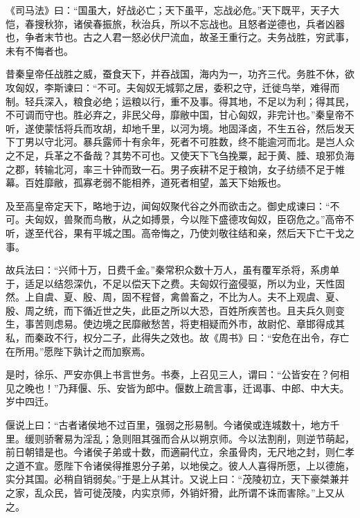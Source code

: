 \documentclass[12pt,UTF8]{ctexbook}
\begin{document}
《司马法》曰：“国虽大，好战必亡；天下虽平，忘战必危。”天下既平，天子大恺，春搜秋狝，诸侯春振旅，秋治兵，所以不忘战也。且怒者逆德也，兵者凶器也，争者末节也。古之人君一怒必伏尸流血，故圣王重行之。夫务战胜，穷武事，未有不悔者也。



昔秦皇帝任战胜之威，蚕食天下，并吞战国，海内为一，功齐三代。务胜不休，欲攻匈奴，李斯谏曰：“不可。夫匈奴无城郭之居，委积之守，迁徙鸟举，难得而制。轻兵深入，粮食必绝；运粮以行，重不及事。得其地，不足以为利；得其民，不可调而守也。胜必弃之，非民父母，靡敝中国，甘心匈奴，非完计也。”秦皇帝不听，遂使蒙恬将兵而攻胡，却地千里，以河为境。地固泽卤，不生五谷，然后发天下丁男以守北河。暴兵露师十有余年，死者不可胜数，终不能逾河而北。是岂人众之不足，兵革之不备哉？其势不可也。又使天下飞刍挽粟，起于黄、腄、琅邪负海之郡，转输北河，率三十钟而致一石。男子疾耕不足于粮饷，女子纺绩不足于帷幕。百姓靡敝，孤寡老弱不能相养，道死者相望，盖天下始叛也。



及至高皇帝定天下，略地于边，闻匈奴聚代谷之外而欲击之。御史成谏曰：“不可。夫匈奴，兽聚而鸟散，从之如搏景，今以陛下盛德攻匈奴，臣窃危之。”高帝不听，遂至代谷，果有平城之围。高帝悔之，乃使刘敬往结和亲，然后天下亡干戈之事。



故兵法曰：“兴师十万，日费千金。”秦常积众数十万人，虽有覆军杀将，系虏单于，适足以结怨深仇，不足以偿天下之费。夫匈奴行盗侵驱，所以为业，天性固然。上自虞、夏、殷、周，固不程督，禽兽畜之，不比为人。夫不上观虞、夏、殷、周之统，而下循近世之失，此臣之所以大恐，百姓所疾苦也。且夫兵久则变生，事苦则虑易。使边境之民靡敝愁苦，将吏相疑而外市，故尉佗、章邯得成其私，而秦政不行，权分二子，此得失之效也。故《周书》曰：“安危在出令，存亡在所用。”愿陛下孰计之而加察焉。



是时，徐乐、严安亦俱上书言世务。书奏，上召见三人，谓曰：“公皆安在？何相见之晚也！”乃拜偃、乐、安皆为郎中。偃数上疏言事，迁谒事、中郎、中大夫。岁中四迁。



偃说上曰：“古者诸侯地不过百里，强弱之形易制。今诸侯或连城数十，地方千里。缓则骄奢易为淫乱；急则阻其强而合从以朔京师。今以法割削，则逆节萌起，前日朝错是也。今诸侯子弟或十数，而適嗣代立，余虽骨肉，无尺地之封，则仁孝之道不宣。愿陛下令诸侯得推恩分子弟，以地侯之。彼人人喜得所愿，上以德施，实分其国。必稍自销弱矣。”于是上从其计。又说上曰：“茂陵初立，天下豪桀兼并之家，乱众民，皆可徙茂陵，内实京师，外销奸猾，此所谓不诛而害除。”上又从之。
\end{document}
